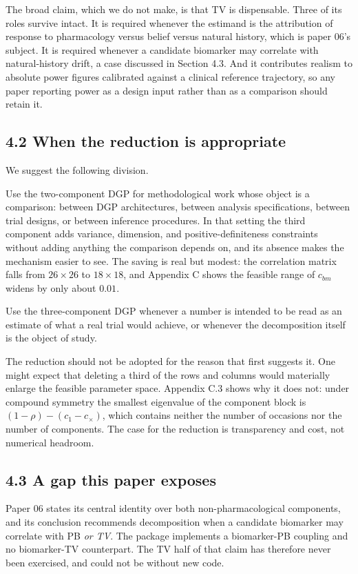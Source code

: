 \documentclass[
  11pt,
]{article}
\begin{document}
The broad claim, which we do not make, is that TV is dispensable.
Three of its roles survive intact. It is required whenever the
estimand is the attribution of response to pharmacology versus belief
versus natural history, which is paper 06's subject. It is required
whenever a candidate biomarker may correlate with natural-history
drift, a case discussed in Section 4.3. And it contributes realism to
absolute power figures calibrated against a clinical reference
trajectory, so any paper reporting power as a design input rather
than as a comparison should retain it.

\subsection{4.2 When the reduction is appropriate}

We suggest the following division.

Use the two-component DGP for methodological work whose object is a
comparison: between DGP architectures, between analysis
specifications, between trial designs, or between inference
procedures. In that setting the third component adds variance,
dimension, and positive-definiteness constraints without adding
anything the comparison depends on, and its absence makes the
mechanism easier to see. The saving is real but modest: the
correlation matrix falls from \(26 \times 26\) to \(18 \times 18\), and
Appendix C shows the feasible range of \(c_{bm}\) widens by only about
\(0.01\).

Use the three-component DGP whenever a number is intended to be read
as an estimate of what a real trial would achieve, or whenever the
decomposition itself is the object of study.

The reduction should not be adopted for the reason that first
suggests it. One might expect that deleting a third of the rows and
columns would materially enlarge the feasible parameter space.
Appendix C.3 shows why it does not: under compound symmetry the
smallest eigenvalue of the component block is
\((1-\rho) - (c_1 - c_{\times})\), which contains neither the number of
occasions nor the number of components. The case for the reduction is
transparency and cost, not numerical headroom.

\subsection{4.3 A gap this paper exposes}

Paper 06 states its central identity over both non-pharmacological
components, and its conclusion recommends decomposition when a
candidate biomarker may correlate with PB \emph{or TV}. The package
implements a biomarker-PB coupling and no biomarker-TV counterpart.
The TV half of that claim has therefore never been exercised, and
could not be without new code.
\end{document}
